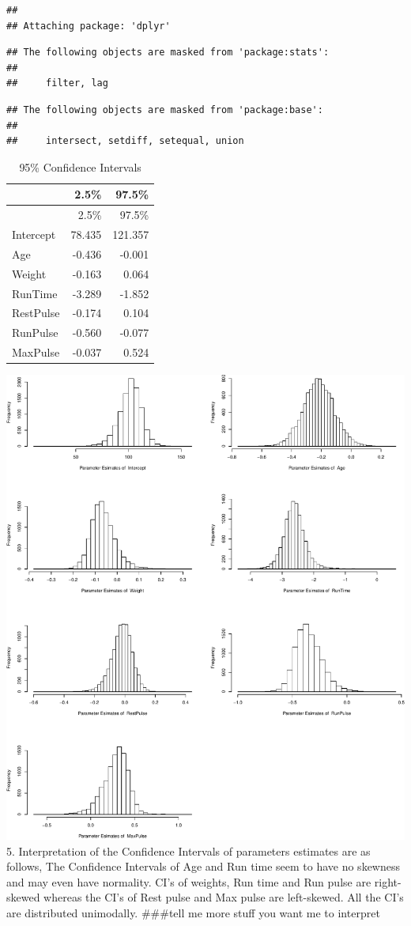 \documentclass[]{article}
\begin{document}
\begin{verbatim}
## 
## Attaching package: 'dplyr'
\end{verbatim}

\begin{verbatim}
## The following objects are masked from 'package:stats':
## 
##     filter, lag
\end{verbatim}

\begin{verbatim}
## The following objects are masked from 'package:base':
## 
##     intersect, setdiff, setequal, union
\end{verbatim}

\begin{longtable}[]{@{}lrr@{}}
\caption{95\% Confidence Intervals}\tabularnewline
\toprule
& 2.5\% & 97.5\%\tabularnewline
\midrule
\endfirsthead
\toprule
& 2.5\% & 97.5\%\tabularnewline
\midrule
\endhead
Intercept & 78.435 & 121.357\tabularnewline
Age & -0.436 & -0.001\tabularnewline
Weight & -0.163 & 0.064\tabularnewline
RunTime & -3.289 & -1.852\tabularnewline
RestPulse & -0.174 & 0.104\tabularnewline
RunPulse & -0.560 & -0.077\tabularnewline
MaxPulse & -0.037 & 0.524\tabularnewline
\bottomrule
\end{longtable}

\includegraphics{Report_files/figure-latex/rcode-1.pdf} 5.
Interpretation of the Confidence Intervals of parameters estimates are
as follows, The Confidence Intervals of Age and Run time seem to have no
skewness and may even have normality. CI's of weights, Run time and Run
pulse are right-skewed whereas the CI's of Rest pulse and Max pulse are
left-skewed. All the CI's are distributed unimodally. \#\#\#tell me more
stuff you want me to interpret
\end{document}
